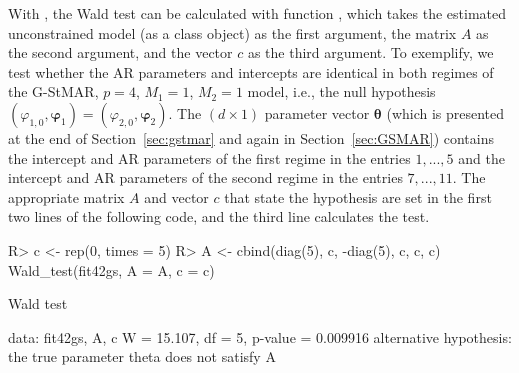 \documentclass[nojss]{jss} %
\begin{document}
With , the Wald test can be calculated with function , which takes the estimated unconstrained model (as a class  object) as the first argument, the matrix $A$ as the second argument, and the vector $c$ as the third argument. To exemplify, we test whether the AR parameters and intercepts are identical in both regimes of the G-StMAR, $p=4$, $M_1=1$, $M_2=1$ model, i.e., the null hypothesis $(\varphi_{1,0},\boldsymbol{\varphi}_1) = (\varphi_{2,0},\boldsymbol{\varphi}_2)$. %
The $(d \times 1)$ parameter vector $\boldsymbol{\theta}$ (which is presented at the end of Section~\ref{sec:gstmar} and again in Section~\ref{sec:GSMAR}) contains the intercept and AR parameters of the first regime in the entries $1,...,5$ and the intercept and AR parameters of the second regime in the entries $7,...,11$. The appropriate matrix $A$ and vector $c$ that state the hypothesis are set in the first two lines of the following code, and the third line calculates the test.
%
\begin{CodeChunk}
\begin{CodeInput}
R> c <- rep(0, times = 5)
R> A <- cbind(diag(5), c, -diag(5), c, c, c)
Wald_test(fit42gs, A = A, c = c)
\end{CodeInput}
\begin{CodeOutput}
	Wald test

data:  fit42gs, A, c
W = 15.107, df = 5, p-value = 0.009916
alternative hypothesis: the true parameter theta does not satisfy
A%
\end{CodeOutput}
\end{CodeChunk}
%
\end{document}
